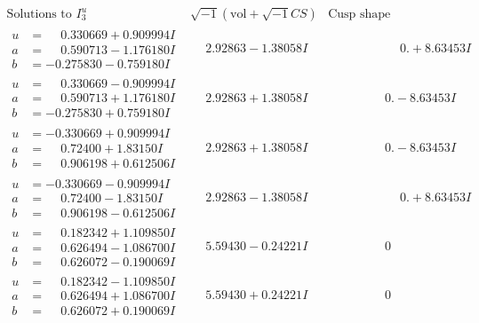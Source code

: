 \documentclass[1p]{elsarticle_modified}
\theoremstyle{definition}
\newcommand{\I}{\sqrt{-1}}
\begin{document}
$$\begin{array}{c|c|c}  
\text{Solutions to }I^u_{3}& \I (\text{vol} + \sqrt{-1}CS) & \text{Cusp shape}\\
 \hline 
\begin{aligned}
u &= \phantom{-}0.330669 + 0.909994 I \\
a &= \phantom{-}0.590713 - 1.176180 I \\
b &= -0.275830 - 0.759180 I\end{aligned}
 & \phantom{-}2.92863 - 1.38058 I & \phantom{-0.000000 -}0. + 8.63453 I \\ \hline\begin{aligned}
u &= \phantom{-}0.330669 - 0.909994 I \\
a &= \phantom{-}0.590713 + 1.176180 I \\
b &= -0.275830 + 0.759180 I\end{aligned}
 & \phantom{-}2.92863 + 1.38058 I & \phantom{-0.000000 } 0. - 8.63453 I \\ \hline\begin{aligned}
u &= -0.330669 + 0.909994 I \\
a &= \phantom{-}0.72400 + 1.83150 I \\
b &= \phantom{-}0.906198 + 0.612506 I\end{aligned}
 & \phantom{-}2.92863 + 1.38058 I & \phantom{-0.000000 } 0. - 8.63453 I \\ \hline\begin{aligned}
u &= -0.330669 - 0.909994 I \\
a &= \phantom{-}0.72400 - 1.83150 I \\
b &= \phantom{-}0.906198 - 0.612506 I\end{aligned}
 & \phantom{-}2.92863 - 1.38058 I & \phantom{-0.000000 -}0. + 8.63453 I \\ \hline\begin{aligned}
u &= \phantom{-}0.182342 + 1.109850 I \\
a &= \phantom{-}0.626494 - 1.086700 I \\
b &= \phantom{-}0.626072 - 0.190069 I\end{aligned}
 & \phantom{-}5.59430 - 0.24221 I & \phantom{-0.000000 } 0 \\ \hline\begin{aligned}
u &= \phantom{-}0.182342 - 1.109850 I \\
a &= \phantom{-}0.626494 + 1.086700 I \\
b &= \phantom{-}0.626072 + 0.190069 I\end{aligned}
 & \phantom{-}5.59430 + 0.24221 I & \phantom{-0.000000 } 0 \\ \hline\begin{aligned}

\end{aligned}
\end{array}$$
\end{document}
